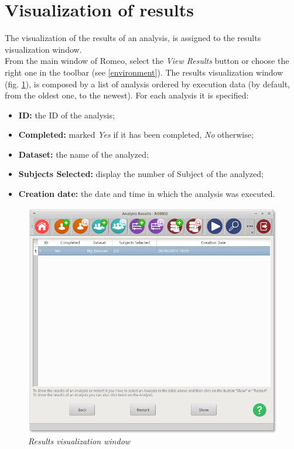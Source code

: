 \section{Visualization of results}
\label{exportation}
The visualization of the results of an analysis, is assigned to the results visualization window.\\
From the main window of Romeo, select the \textit{View Results} button or choose the right one in the toolbar (see \ref{environment}). The results visualization window (fig. \ref{visualizeresults}), is composed by a list of analysis ordered by execution data (by default, from the oldest one, to the newest). For each analysis it is specified:
\begin{itemize}
\item \textbf{ID:} the ID of the analysis;
\item \textbf{Completed:} marked \textit{Yes} if it has been completed, \textit{No} otherwise;
\item \textbf{Dataset:} the name of the \dataset{} analyzed;
\item \textbf{Subjects Selected:} display the number of Subject\g{} of the \dataset{} analyzed;
\item \textbf{Creation date:} the date and time in which the analysis was executed.
\end{itemize}
\begin{figure}[!h]
\begin{center}
\includegraphics[scale=0.4]{./Images/AnalysisList}
\caption{\textit{Results visualization window}}
\label{visualizeresults}
\end{center}
\end{figure}
